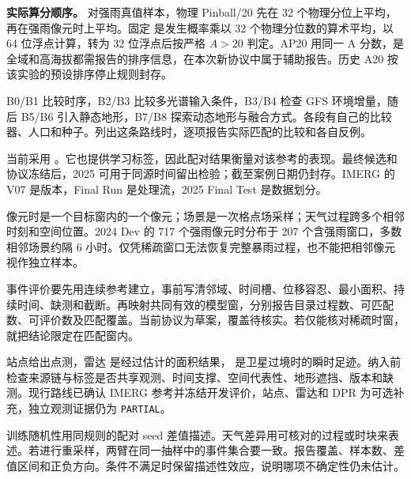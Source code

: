 \textbf{实际算分顺序。} 对强雨真值样本，物理 Pinball/20 先在 32 个物理分位上平均，再在强雨像元时上平均。固定 是发生概率乘以 32 个物理分位数的算术平均，以 64 位浮点计算，转为 32 位浮点后按严格 \(A>20\) 判定。AP20 用同一 A 分数，是全域和高海拔都需报告的排序信息，在本次新协议中属于辅助报告。历史 A20 按该实验的预设排序停止规则封存。


B0/B1 比较时序，B2/B3 比较多光谱输入条件，B3/B4 检查 GFS 环境增量，随后 B5/B6 引入静态地形，B7/B8 探索动态地形与融合方式。各段有自己的比较器、人口和种子。列出这条路线时，逐项报告实际匹配的比较和各自反例。


\label{p-verification}
当前采用 。它也提供学习标签，因此配对结果衡量对该参考的表现。最终候选和协议冻结后，2025 可用于同源时间留出检验；截至案例日期仍封存。IMERG 的 V07 是版本，Final Run 是处理流，2025 Final Test 是数据划分。

像元时是一个目标窗内的一个像元；场景是一次格点场采样；天气过程跨多个相邻时刻和空间位置。2024 Dev 的 717 个强雨像元时分布于 207 个含强雨窗口，多数相邻场景约隔 6 小时。仅凭稀疏窗口无法恢复完整暴雨过程，也不能把相邻像元视作独立样本。

事件评价要先用连续参考建立，事前写清邻域、时间槽、位移容忍、最小面积、持续时间、缺测和截断。再映射共同有效的模型窗，分别报告目录过程数、可匹配数、可评价数及匹配覆盖。当前协议为草案，覆盖待核实。若仅能核对稀疏时窗，就把结论限定在匹配窗内。

站点给出点测，雷达  是经过估计的面积结果， 是卫星过境时的瞬时足迹。纳入前检查来源链与标签是否共享观测、时间支撑、空间代表性、地形遮挡、版本和缺测。现行路线已确认 IMERG 参考并冻结开发评价，站点、雷达和 DPR 为可选补充，独立观测证据仍为 \texttt{PARTIAL}。

训练随机性用同规则的配对 seed 差值描述。天气差异用可核对的过程或时块来表述。若进行重采样，两臂在同一抽样中的事件集合要一致。报告覆盖、样本数、差值区间和正负方向。条件不满足时保留描述性效应，说明哪项不确定性仍未估计。

